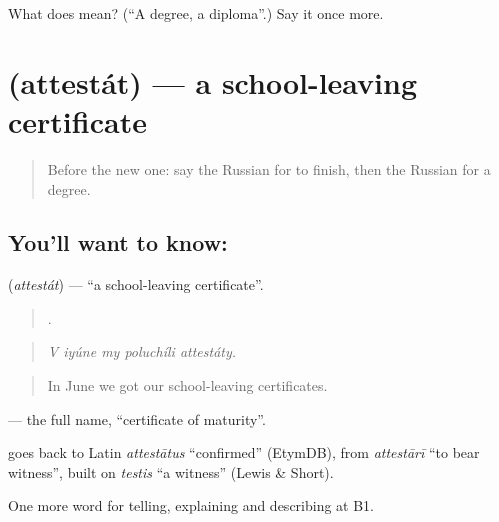 \begin{tcolorbox}[breakable,colback=teal!4,colframe=teal!35!black,title={Before you move on}]
What does  mean? (\textquotedblleft{}A degree, a diploma\textquotedblright{}.) Say it once more.
\end{tcolorbox}
\section[\texorpdfstring{\ru{аттестат} (attestát)}{аттестат (attestát)}]{ (attestát) — a school-leaving certificate}

\label{lesson:RU-C308-attestat}



\begin{quote}
Before the new one: say the Russian for to finish, then the Russian for a degree.
\end{quote}

\subsection*{You'll want to know: }
\textbf{} (\emph{attestát}) — \textquotedblleft{}a school-leaving certificate\textquotedblright{}.

\begin{quote}
    .
\end{quote}

\begin{quote}
\emph{V iyúne my poluchíli attestáty.}
\end{quote}

\begin{quote}
In June we got our school-leaving certificates.
\end{quote}

\emph{ } — the full name, \textquotedblleft{}certificate of maturity\textquotedblright{}.

\begin{cousinweb}
\emph{} goes back to Latin \emph{attestātus} \textquotedblleft{}confirmed\textquotedblright{} (EtymDB), from \emph{attestārī} \textquotedblleft{}to bear witness\textquotedblright{}, built on \emph{testis} \textquotedblleft{}a witness\textquotedblright{} (Lewis \& Short).
\end{cousinweb}

\begin{grammarlens}[title={What you've built}]
One more word for telling, explaining and describing at B1.
\end{grammarlens}

